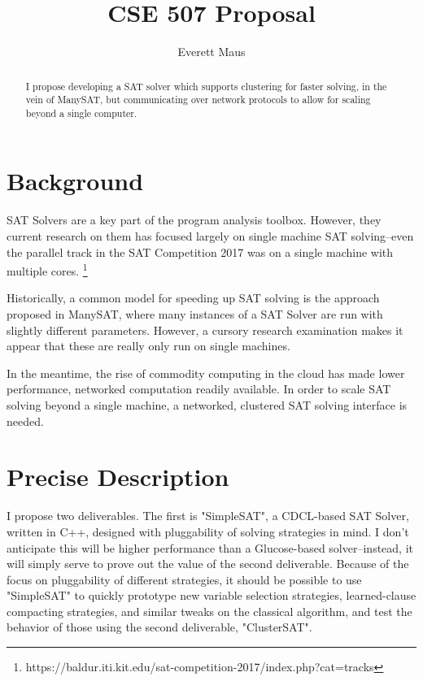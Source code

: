 \documentclass[10pt]{article}
\title{CSE 507 Proposal}
\author{Everett Maus}
\begin{document}
\maketitle

\begin{abstract}
  I propose developing a SAT solver which supports clustering for faster solving, in the 
  vein of ManySAT, but communicating over network protocols to allow for scaling beyond
  a single computer.
\end{abstract}

\section{Background}
SAT Solvers are a key part of the program analysis toolbox.  However, they current research on
  them has focused largely on single machine SAT solving--even the parallel track in the SAT 
  Competition 2017 was on a single machine with multiple cores. \footnote{https://baldur.iti.kit.edu/sat-competition-2017/index.php?cat=tracks}

  Historically, a common model for speeding up SAT solving is the approach proposed in ManySAT,
  where many instances of a SAT Solver are run with slightly different parameters.  However,
  a cursory research examination makes it appear that these are really only run on single machines.

  In the meantime, the rise of commodity computing in the cloud has made lower performance, networked
  computation readily available.  In order to scale SAT solving beyond a single machine, a networked, clustered
  SAT solving interface is needed.

\section{Precise Description}

  I propose two deliverables.  The first is "SimpleSAT", a CDCL-based SAT Solver, 
  written in C++, designed with pluggability of solving strategies in mind.  I don't anticipate
  this will be higher performance than a Glucose-based solver--instead, it will simply serve to
  prove out the value of the second deliverable.  Because of the focus on pluggability of different
  strategies, it should be possible to use "SimpleSAT" to quickly prototype new variable
  selection strategies, learned-clause compacting strategies, and similar tweaks on the classical
  algorithm, and test the behavior of those using the second deliverable, "ClusterSAT".
\end{document}
